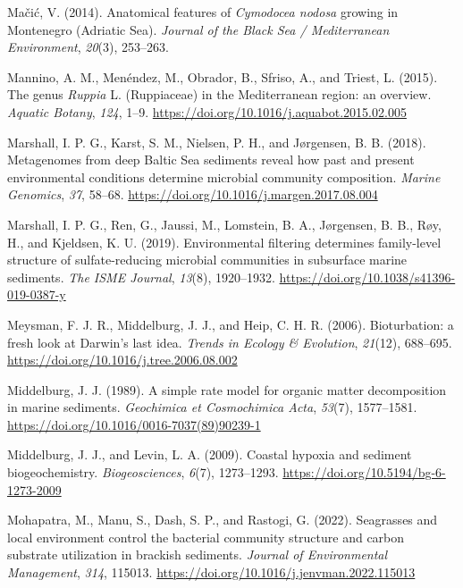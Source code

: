 \documentclass[
  12 pt,
]{book}
\newlength{\cslhangindent}
\newlength{\cslentryspacingunit} %
\newenvironment{CSLReferences}[2] %
 {%
  \setlength{\parindent}{0pt}
  \ifodd #1
  \let\oldpar\par
  \def\par{\hangindent=\cslhangindent\oldpar}
  \fi
  \setlength{\parskip}{#2\cslentryspacingunit}
 }%
 {}
\begin{document}
\begin{CSLReferences}{1}{0}
\leavevmode{}%
Mačić, V. (2014). Anatomical features of {{{\emph{Cymodocea nodosa}}} growing in Montenegro (Adriatic Sea)}. \emph{Journal of the Black Sea / Mediterranean Environment}, \emph{20}(3), 253--263.

\leavevmode{}%
Mannino, A. M., Menéndez, M., Obrador, B., Sfriso, A., and Triest, L. (2015). The genus {{\emph{Ruppia}}} {L}. ({Ruppiaceae}) in the {Mediterranean} region: an overview. \emph{Aquatic Botany}, \emph{124}, 1--9. \url{https://doi.org/10.1016/j.aquabot.2015.02.005}

\leavevmode{}%
Marshall, I. P. G., Karst, S. M., Nielsen, P. H., and Jørgensen, B. B. (2018). Metagenomes from deep {Baltic Sea} sediments reveal how past and present environmental conditions determine microbial community composition. \emph{Marine Genomics}, \emph{37}, 58--68. \url{https://doi.org/10.1016/j.margen.2017.08.004}

\leavevmode{}%
Marshall, I. P. G., Ren, G., Jaussi, M., Lomstein, B. A., Jørgensen, B. B., Røy, H., and Kjeldsen, K. U. (2019). Environmental filtering determines family-level structure of sulfate-reducing microbial communities in subsurface marine sediments. \emph{The ISME Journal}, \emph{13}(8), 1920--1932. \url{https://doi.org/10.1038/s41396-019-0387-y}

\leavevmode{}%
Meysman, F. J. R., Middelburg, J. J., and Heip, C. H. R. (2006). Bioturbation: a fresh look at {Darwin}'s last idea. \emph{Trends in Ecology \& Evolution}, \emph{21}(12), 688--695. \url{https://doi.org/10.1016/j.tree.2006.08.002}

\leavevmode{}%
Middelburg, J. J. (1989). A simple rate model for organic matter decomposition in marine sediments. \emph{Geochimica et Cosmochimica Acta}, \emph{53}(7), 1577--1581. \url{https://doi.org/10.1016/0016-7037(89)90239-1}

\leavevmode{}%
Middelburg, J. J., and Levin, L. A. (2009). Coastal hypoxia and sediment biogeochemistry. \emph{Biogeosciences}, \emph{6}(7), 1273--1293. \url{https://doi.org/10.5194/bg-6-1273-2009}

\leavevmode{}%
Mohapatra, M., Manu, S., Dash, S. P., and Rastogi, G. (2022). Seagrasses and local environment control the bacterial community structure and carbon substrate utilization in brackish sediments. \emph{Journal of Environmental Management}, \emph{314}, 115013. \url{https://doi.org/10.1016/j.jenvman.2022.115013}


\end{CSLReferences}
\end{document}
